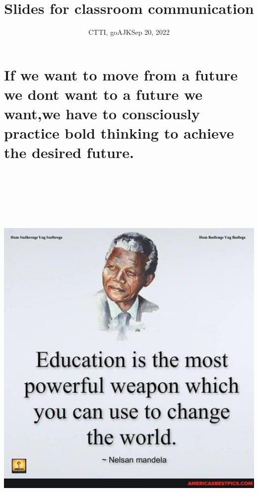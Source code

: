 \documentclass[
  ignorenonframetext,
]{beamer}
\title{{Slides for classroom communication}}
\author{{CTTI, goAJK}{Sep 20, 2022}}
\date{}
\begin{document}
\frame{\titlepage}
\ifdefined\Shaded\renewenvironment{Shaded}{\begin{tcolorbox}[frame hidden, interior hidden, boxrule=0pt, sharp corners, enhanced, breakable, borderline west={3pt}{0pt}{shadecolor}]}{\end{tcolorbox}}\fi

\hypertarget{if-we-want-to-move-from-a-future-we-dont-want-to-a-future-we-wantwe-have-to-consciously-practice-bold-thinking-to-achieve-the-desired-future.}{%
\section{If we want to move from a future we dont want to a future we
want,we have to consciously practice bold thinking to achieve the
desired
future.}\label{if-we-want-to-move-from-a-future-we-dont-want-to-a-future-we-wantwe-have-to-consciously-practice-bold-thinking-to-achieve-the-desired-future.}}

\begin{frame}{\includegraphics[width=13.54167in,height=7.8125in]{images/mandela.jpg}}
\protect\hypertarget{section}{}
\end{frame}
\end{document}
